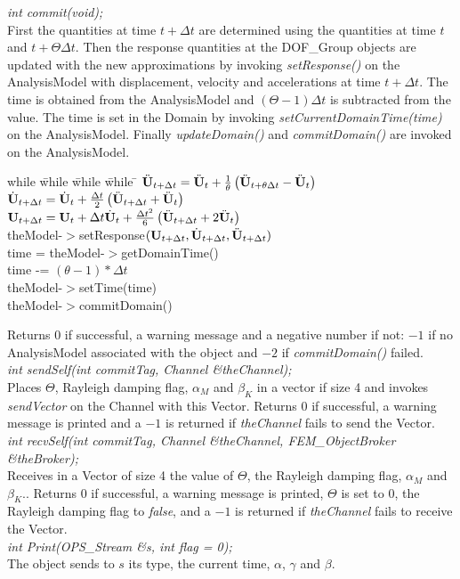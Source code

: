 {\em int commit(void);}\\
First the quantities at time $t + \Delta t$ are determined using the
quantities at time $t$ and $t + \Theta \Delta t$.
Then the response quantities at the DOF\_Group objects are updated
with the new approximations by invoking {\em setResponse()} on the
AnalysisModel with displacement, velocity and accelerations at time $t +
\Delta t$. The time is obtained from the AnalysisModel and $(\Theta
-1) \Delta t$ is subtracted from the value. The time is set in the
Domain by invoking {\em setCurrentDomainTime(time)} on the
AnalysisModel. Finally {\em updateDomain()} and {\em commitDomain()}
are invoked on the AnalysisModel. 
\begin{tabbing}
while \= while \= while \= while \= \kill
\>\> $\ddot{\bf U}_{t + \Delta t} = \ddot{\bf U}_t + \frac{1}{\theta} \left( \ddot{\bf U}_{t +
\theta \Delta t} - \ddot{\bf U}_t \right)$ \\
\>\> $ \dot{\bf U}_{t + \Delta t} = \dot{\bf U}_t + \frac{\Delta t}{2}\left( \ddot{\bf U}_{t +
\Delta t} + \ddot{\bf U}_t \right) $ \\
\>\> $ {\bf U}_{t + \Delta t} = {\bf U}_t + \Delta t\dot{\bf U}_t + \frac{\Delta t^2}{6}\left(
\ddot{\bf U}_{t + \Delta t} + 2 \ddot{\bf U}_t \right) $ \\
\>\> theModel-$>$setResponse$({\bf U}_{t + \Delta t}, \dot{\bf U}_{t+
\Delta t}, \ddot{\bf U}_{t+\Delta t})$ \\
\>\> time = theModel-$>$getDomainTime() \\
\>\> time -= $(\theta -1) * \Delta t$ \\
\>\> theModel-$>$setTime(time) \\
\>\> theModel-$>$commitDomain()
\end{tabbing}
Returns $0$ if successful, a warning
message and a negative number if not: $-1$ if no AnalysisModel
associated with the object and $-2$ if {\em commitDomain()} failed. \\


{\em int sendSelf(int commitTag, Channel \&theChannel); } \\ 
Places $\Theta$, Rayleigh damping flag, $\alpha_M$ and $\beta_K$ in a
vector if size 4 and invokes {\em sendVector} on the Channel with this
Vector. Returns $0$ if successful, a warning message is printed and a
$-1$ is returned if {\em theChannel} fails to send the Vector. \\ 

{\em int recvSelf(int commitTag, Channel \&theChannel, 
FEM\_ObjectBroker \&theBroker); } \\ 
Receives in a Vector of size 4 the value of $\Theta$, the Rayleigh
damping flag, $\alpha_M$ and $\beta_K$.. Returns $0$ if
successful, a warning message is printed,  $\Theta$ is set to $0$, the
Rayleigh damping flag to {\em false}, and a $-1$ is returned if {\em
theChannel} fails to receive the Vector.\\ 

{\em int Print(OPS_Stream \&s, int flag = 0);}\\
The object sends to $s$ its type, the current time, $\alpha$, $\gamma$ and
$\beta$. 

